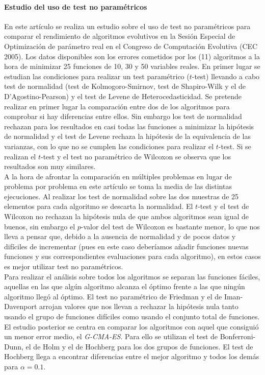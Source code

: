 	\paragraph{Estudio del uso de test no paramétricos} \cite{GARCIA09} En este artículo se realiza un estudio sobre el uso de test no paramétricos para comparar el rendimiento de algoritmos evolutivos en la Sesión Especial de Optimización de parámetro real en el Congreso de Computación Evolutiva (CEC 2005). Los datos disponibles son los errores cometidos por los (11) algoritmos a la hora de minimizar 25 funciones de 10, 30 y 50 variables reales. En primer lugar se estudian las condiciones para realizar un test paramétrico ($t$-test) llevando a cabo test de normalidad (test de Kolmogoro-Smirnov, test de Shapiro-Wilk y el de D'Agostino-Pearson) y el test de Levene de Heterocedasticidad. Se pretende realizar en primer lugar la comparación entre dos de los algoritmos para comprobar si hay diferencias entre ellos. Sin embargo los test de normalidad rechazan para los resultados en casi todas las funciones a minimizar la hipótesis de normalidad y el test de Levene rechaza la hipótesis de la equivalencia de las varianzas, con lo que no se cumplen las condiciones para realizar el $t$-test. Si se realizan el $t$-test y el test no paramétrico de Wilcoxon se observa que los resultados son muy similares.\\
	A la hora de afrontar la comparación en múltiples problemas en lugar de problema por problema en este artículo se toma la media de las distintas ejecuciones. Al realizar los test de normalidad sobre las dos muestras de 25 elementos para cada algoritmo se descarta la normalidad. El $t$-test y el test de Wilcoxon no rechazan la hipótesis nula de que ambos algoritmos sean igual de buenos, sin embargo el $p$-valor del test de Wilcoxon es bastante menor, lo que nos lleva a pensar que, debido a la ausencia de normalidad y de pocos datos y difíciles de incrementar (pues en este caso deberíamos añadir funciones nuevas funciones y sus correspondientes evaluaciones para cada algoritmo), en estos casos es mejor utilizar test no paramétricos.\\
	Para realizar el análisis sobre todos los algoritmos se separan las funciones fáciles, aquellas en las que algún algoritmo alcanza el óptimo frente a las que ningún algoritmo llegó al óptimo. El test no paramétrico de Friedman y el de Iman-Davenport arrojan valores que nos llevan a rechazar la hipótesis nula tanto usando el grupo de funciones difíciles como usando el conjunto total de funciones.\\
	El estudio posterior se centra en comparar los algoritmos con aquel que consiguió un menor error medio, el \textit{G-CMA-ES}. Para ello se utilizan el test de Bonferroni-Dunn, el de Holm y el de Hochberg para los dos grupos de funciones. El test de Hochberg llega a encontrar diferencias entre el mejor algoritmo y todos los demás para $\alpha=0.1$. 
	
